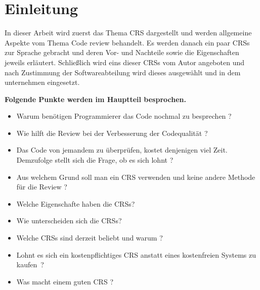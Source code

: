 \section{Einleitung}
\label{sec:Einleitung}

In dieser Arbeit wird zuerst das Thema \ac{CRS} dargestellt und werden allgemeine Aspekte vom Thema Code review behandelt.
Es werden danach ein paar \acp{CRS} zur Sprache gebracht und deren Vor- und Nachteile sowie die Eigenschaften jeweils erläutert.
Schließlich wird eins dieser \acp{CRS} vom Autor angeboten und nach Zustimmung der Softwareabteilung wird dieses ausgewählt und in dem unternehmen eingesetzt.

\vspace{2cm}
\textbf{Folgende Punkte werden im Hauptteil besprochen.}

\begin{itemize}
\item Warum benötigen Programmierer das Code nochmal zu besprechen ?
\item Wie hilft die Review bei der Verbesserung der Codequalität ?
\item Das Code von jemandem zu überprüfen, kostet denjenigen viel Zeit. Demzufolge stellt sich die Frage, ob es sich lohnt ?
\item Aus welchem Grund soll man ein \ac{CRS} verwenden und keine andere Methode für die Review ?
\item Welche Eigenschafte haben die \acp{CRS}?
\item Wie unterscheiden sich die \acp{CRS}?
\item Welche \acp{CRS} sind derzeit beliebt und warum ?
\item Lohnt es sich ein kostenpflichtiges \ac{CRS} anstatt eines kostenfreien Systems zu kaufen~?
\item Was macht einem guten \ac{CRS} ?
\end{itemize}

\newpage
\listoftodos
